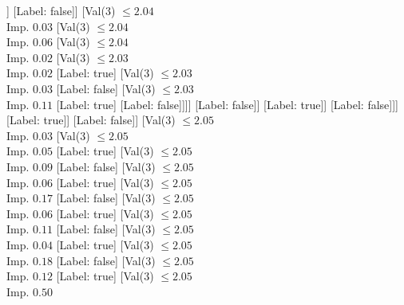 \documentclass[margin=10pt]{standalone}
\begin{document}
\begin{forest}
									[Val($3$) $ \leq 2.04$ \\ Imp. $0.01$
										[Val($3$) $ \leq 2.04$ \\ Imp. $0.03$
											[Val($3$) $ \leq 2.03$ \\ Imp. $0.01$
												[Val($3$) $ \leq 2.02$ \\ Imp. $0.02$
													[Val($3$) $ \leq 2.02$ \\ Imp. $0.12$
														[Label: false]
														[Label: true]]
													[Label: false]]
												[Val($3$) $ \leq 2.04$ \\ Imp. $0.03$
													[Val($3$) $ \leq 2.04$ \\ Imp. $0.06$
														[Val($3$) $ \leq 2.04$ \\ Imp. $0.02$
															[Val($3$) $ \leq 2.03$ \\ Imp. $0.02$
																[Label: true]
																[Val($3$) $ \leq 2.03$ \\ Imp. $0.03$
																	[Label: false]
																	[Val($3$) $ \leq 2.03$ \\ Imp. $0.11$
																		[Label: true]
																		[Label: false]]]]
															[Label: false]]
														[Label: true]]
													[Label: false]]]
											[Label: true]]
										[Label: false]]
									[Val($3$) $ \leq 2.05$ \\ Imp. $0.03$
										[Val($3$) $ \leq 2.05$ \\ Imp. $0.05$
											[Label: true]
											[Val($3$) $ \leq 2.05$ \\ Imp. $0.09$
												[Label: false]
												[Val($3$) $ \leq 2.05$ \\ Imp. $0.06$
													[Label: true]
													[Val($3$) $ \leq 2.05$ \\ Imp. $0.17$
														[Label: false]
														[Val($3$) $ \leq 2.05$ \\ Imp. $0.06$
															[Label: true]
															[Val($3$) $ \leq 2.05$ \\ Imp. $0.11$
																[Label: false]
																[Val($3$) $ \leq 2.05$ \\ Imp. $0.04$
																	[Label: true]
																	[Val($3$) $ \leq 2.05$ \\ Imp. $0.18$
																		[Label: false]
																		[Val($3$) $ \leq 2.05$ \\ Imp. $0.12$
																			[Label: true]
																			[Val($3$) $ \leq 2.05$ \\ Imp. $0.50$

\end{forest}
\end{document}
